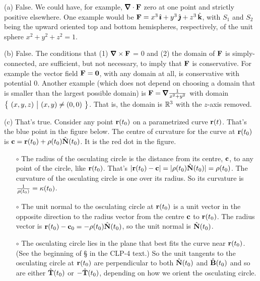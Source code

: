 \begin{solution} (a) False. We could have, for example,
$\vnabla\cdot\vF$ zero at one point and strictly positive elsewhere.
One example would be $\mathbf{F} = x^3\,\hat{\pmb{\imath}}+y^3\,\hat{\pmb{\jmath}} +z^3\,\hat{\mathbf{k}}$, with $S_1$ and
$S_2$ being the upward oriented top and bottom hemispheres, respectively, 
of the unit sphere $x^2+y^2+z^2=1$.

(b) False. The conditions that (1) $\vnabla\times\vF$ = 0 and (2) the domain of
$\mathbf{F}$ is simply-connected, are sufficient, but not necessary, 
to imply that $\mathbf{F}$ is conservative. For example the vector field
$\mathbf{F}=\mathbf{0}$, with any domain at all, is conservative with potential $0$.
Another example (which does not depend on choosing a domain that is smaller
than the largest possible domain) is $\vF=\vnabla\frac{1}{x^2+y^2}$
with domain $\big\{ \ (x,y,z)\ \big|\  (x,y)\ne  (0,0)\ \big\}$. That is, the domain is
$\mathbb{R}^3$ with the $z$-axis removed.

(c) That's true. Consider any point $\mathbf{r}(t_0)$ on a parametrized curve 
$\mathbf{r}(t)$. That's the blue point in the figure below.
The centre of curvature for the curve at $\mathbf{r}(t_0)$ is
$\mathbf{c} = \mathbf{r}(t_0)+\rho(t_0)\hat{\mathbf{N}}(t_0)$. It is the red dot in the figure.
\begin{itemize}\itemsep1pt \parskip0pt  %
\item[$\circ$]
The radius of the osculating circle is the distance from its centre,
$\mathbf{c}$, to any point of the circle,
like $\mathbf{r}(t_0)$. That's $|\mathbf{r}(t_0) -\mathbf{c}| = |\rho(t_0)\hat{\mathbf{N}}(t_0)| 
= \rho(t_0)$. 
The curvature of the osculating circle is one over its radius.
So its curvature is $\frac{1}{\rho(t_0)}=\kappa(t_0)$.
\item[$\circ$]
The unit normal to the osculating circle at $\mathbf{r}(t_0)$ is a unit
vector in the opposite direction to the radius vector from the centre
$\mathbf{c}$ to $\mathbf{r}(t_0)$. The radius vector is 
$\mathbf{r}(t_0)-\mathbf{c}_0=-\rho(t_0)\hat{\mathbf{N}}(t_0)$, so the unit normal is $\hat{\mathbf{N}}(t_0)$.
\item[$\circ$]
The osculating circle lies in the plane that best fits the curve
near $\mathbf{r}(t_0)$. (See the beginning of \S{}
in the CLP-4 text.) So the unit tangents to the osculating circle
at $\mathbf{r}(t_0)$ are perpendicular to both $\hat{\mathbf{N}}(t_0)$ and 
$\hat{\mathbf{B}}(t_0)$ and so are either $\hat{\mathbf{T}}(t_0)$ or $-\hat{\mathbf{T}}(t_0)$,
depending on how we orient the osculating circle.
\end{itemize}


\end{solution}
